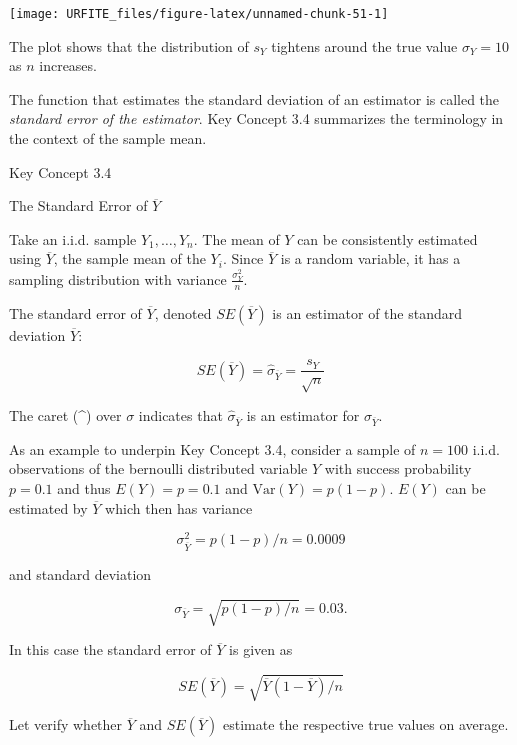 \documentclass[]{book}
\theoremstyle{definition}
\theoremstyle{definition}
\theoremstyle{definition}
\theoremstyle{remark}
\begin{document}
\begin{center}\texttt{[image: URFITE\_files/figure-latex/unnamed-chunk-51-1]} \end{center}

The plot shows that the distribution of \(s_Y\) tightens around the true
value \(\sigma_Y = 10\) as \(n\) increases.

The function that estimates the standard deviation of an estimator is
called the \emph{standard error of the estimator}. Key Concept 3.4
summarizes the terminology in the context of the sample mean.

Key Concept 3.4

The Standard Error of \(\overline{Y}\)

Take an i.i.d. sample \(Y_1, \dots, Y_n\). The mean of \(Y\) can be
consistently estimated using \(\overline{Y}\), the sample mean of the
\(Y_i\). Since \(\overline{Y}\) is a random variable, it has a sampling
distribution with variance \(\frac{\sigma_Y^2}{n}\).

The standard error of \(\overline{Y}\), denoted \(SE(\overline{Y})\) is
an estimator of the standard deviation \(\overline{Y}\):

\[ SE(\overline{Y}) = \hat\sigma_{\overline{Y}} = \frac{s_Y}{\sqrt{n}} \]

The caret (\^{}) over \(\sigma\) indicates that
\(\hat\sigma_{\overline{Y}}\) is an estimator for
\(\sigma_{\overline{Y}}\).

As an example to underpin Key Concept 3.4, consider a sample of
\(n=100\) i.i.d. observations of the bernoulli distributed variable
\(Y\) with success probability \(p=0.1\) and thus \(E(Y)=p=0.1\) and
\(\text{Var}(Y)=p(1-p)\). \(E(Y)\) can be estimated by \(\overline{Y}\)
which then has variance

\[ \sigma^2_{\overline{Y}} = p(1-p)/n = 0.0009 \]

and standard deviation

\[ \sigma_{\overline{Y}} = \sqrt{p(1-p)/n} = 0.03. \]

In this case the standard error of \(\overline{Y}\) is given as

\[ SE(\overline{Y}) = \sqrt{\overline{Y}(1-\overline{Y})/n} \]

Let verify whether \(\overline{Y}\) and \(SE(\overline{Y})\) estimate
the respective true values on average.
\end{document}
